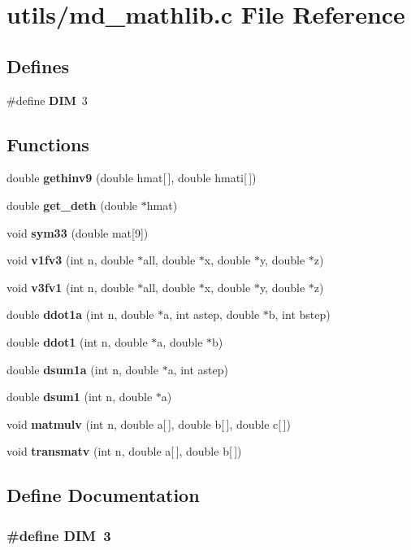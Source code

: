 \section{utils/md\_\-mathlib.c File Reference}
\label{md__mathlib_8c}
\subsection*{Defines}
\begin{CompactItemize}
\item 
\#define {\bf DIM}~3
\end{CompactItemize}
\subsection*{Functions}
\begin{CompactItemize}
\item 
double {\bf gethinv9} (double hmat[$\,$], double hmati[$\,$])
\item 
double {\bf get\_\-deth} (double $\ast$hmat)
\item 
void {\bf sym33} (double mat[9])
\item 
void {\bf v1fv3} (int n, double $\ast$all, double $\ast$x, double $\ast$y, double $\ast$z)
\item 
void {\bf v3fv1} (int n, double $\ast$all, double $\ast$x, double $\ast$y, double $\ast$z)
\item 
double {\bf ddot1a} (int n, double $\ast$a, int astep, double $\ast$b, int bstep)
\item 
double {\bf ddot1} (int n, double $\ast$a, double $\ast$b)
\item 
double {\bf dsum1a} (int n, double $\ast$a, int astep)
\item 
double {\bf dsum1} (int n, double $\ast$a)
\item 
void {\bf matmulv} (int n, double a[$\,$], double b[$\,$], double c[$\,$])
\item 
void {\bf transmatv} (int n, double a[$\,$], double b[$\,$])
\end{CompactItemize}


\subsection{Define Documentation}
\subsubsection{\setlength{\rightskip}{0pt plus 5cm}\#define DIM~3}\label{md__mathlib_8c_c25189db92959bff3c6c2adf4c34b50a}





